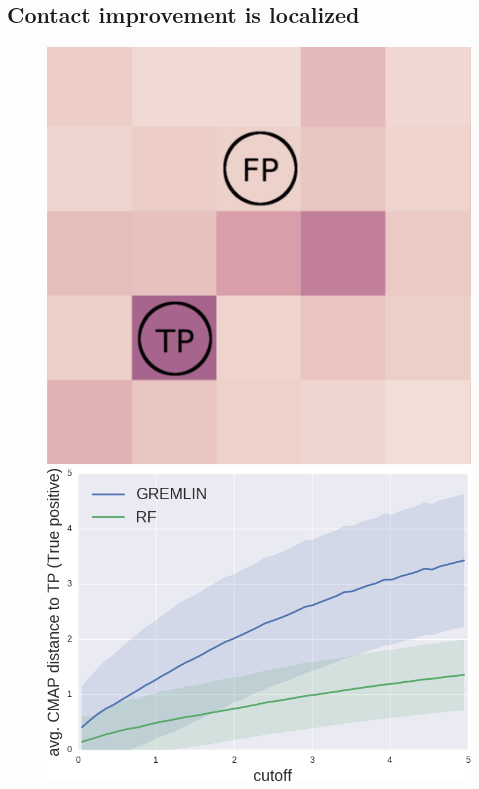 \documentclass[landscape]{sciposter}
\newlength{\customfigheight}
\begin{document}
\begin{multicols}{3}

\section*{Contact improvement is localized}

\begin{figure}
    \center 
    \hfill%
    \includegraphics[height=1.2\customfigheight]{figures/local_structure_distance.png}%
    \hfill%
    \includegraphics[height=1.2\customfigheight]{figures/FP_distance.png}%
    \hfill%
    \hspace{0em}


\end{figure}
\end{multicols}
\end{document}
